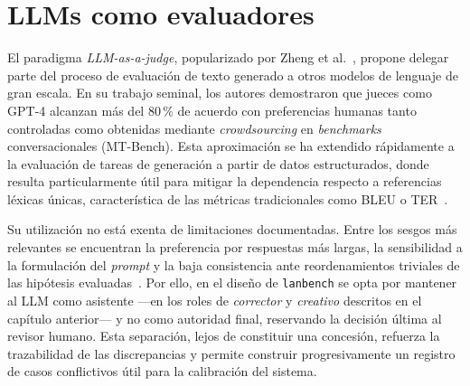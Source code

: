 \section{LLMs como evaluadores}
\label{sec:llm-as-judge}

El paradigma \textit{LLM-as-a-judge}, popularizado por Zheng et
al.~\cite{Zheng2023}, propone delegar parte del proceso de evaluación de texto
generado a otros modelos de lenguaje de gran escala. En su trabajo seminal, los
autores demostraron que jueces como GPT-4 alcanzan más del 80\,\% de acuerdo
con preferencias humanas tanto controladas como obtenidas mediante
\textit{crowdsourcing} en \textit{benchmarks} conversacionales (MT-Bench). Esta
aproximación se ha extendido rápidamente a la evaluación de tareas de
generación a partir de datos estructurados, donde resulta particularmente útil
para mitigar la dependencia respecto a referencias léxicas únicas,
característica de las métricas tradicionales como BLEU o
TER~\cite{Papineni2002,Snover2006}.

Su utilización no está exenta de limitaciones documentadas. Entre los sesgos
más relevantes se encuentran la preferencia por respuestas más largas, la
sensibilidad a la formulación del \textit{prompt} y la baja consistencia ante
reordenamientos triviales de las hipótesis evaluadas~\cite{Zheng2023}. Por
ello, en el diseño de \texttt{lanbench} se opta por mantener al LLM como
asistente ---en los roles de \textit{corrector} y \textit{creativo} descritos en
el capítulo anterior--- y no como autoridad final, reservando la decisión última
al revisor humano. Esta separación, lejos de constituir una concesión, refuerza
la trazabilidad de las discrepancias y permite construir progresivamente un
registro de casos conflictivos útil para la calibración del sistema.
